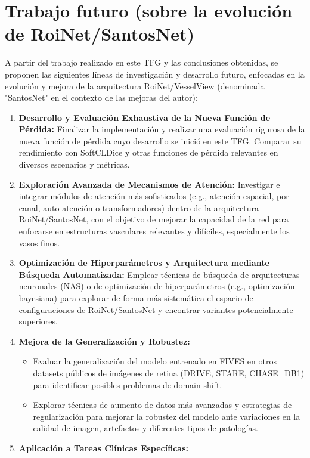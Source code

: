\documentclass[11pt,a4paper]{report} %
\begin{document}
\section{Trabajo futuro (sobre la evolución de RoiNet/SantosNet)}
A partir del trabajo realizado en este TFG y las conclusiones obtenidas, se proponen las siguientes líneas de investigación y desarrollo futuro, enfocadas en la evolución y mejora de la arquitectura RoiNet/VesselView (denominada "SantosNet" en el contexto de las mejoras del autor):
\begin{enumerate}
  \item \textbf{Desarrollo y Evaluación Exhaustiva de la Nueva Función de Pérdida:} Finalizar la implementación y realizar una evaluación rigurosa de la nueva función de pérdida cuyo desarrollo se inició en este TFG. Comparar su rendimiento con SoftCLDice y otras funciones de pérdida relevantes en diversos escenarios y métricas.
  \item \textbf{Exploración Avanzada de Mecanismos de Atención:} Investigar e integrar módulos de atención más sofisticados (e.g., atención espacial, por canal, auto-atención o transformadores) dentro de la arquitectura RoiNet/SantosNet, con el objetivo de mejorar la capacidad de la red para enfocarse en estructuras vasculares relevantes y difíciles, especialmente los vasos finos.
  \item \textbf{Optimización de Hiperparámetros y Arquitectura mediante Búsqueda Automatizada:} Emplear técnicas de búsqueda de arquitecturas neuronales (NAS) o de optimización de hiperparámetros (e.g., optimización bayesiana) para explorar de forma más sistemática el espacio de configuraciones de RoiNet/SantosNet y encontrar variantes potencialmente superiores.
  \item \textbf{Mejora de la Generalización y Robustez:}
    \begin{itemize}
        \item Evaluar la generalización del modelo entrenado en FIVES en otros datasets públicos de imágenes de retina (DRIVE, STARE, CHASE\_DB1) para identificar posibles problemas de domain shift.
        \item Explorar técnicas de aumento de datos más avanzadas y estrategias de regularización para mejorar la robustez del modelo ante variaciones en la calidad de imagen, artefactos y diferentes tipos de patologías.
    \end{itemize}
  \item \textbf{Aplicación a Tareas Clínicas Específicas:}
    \begin{itemize}

\end{itemize}
\end{enumerate}
\end{document}
